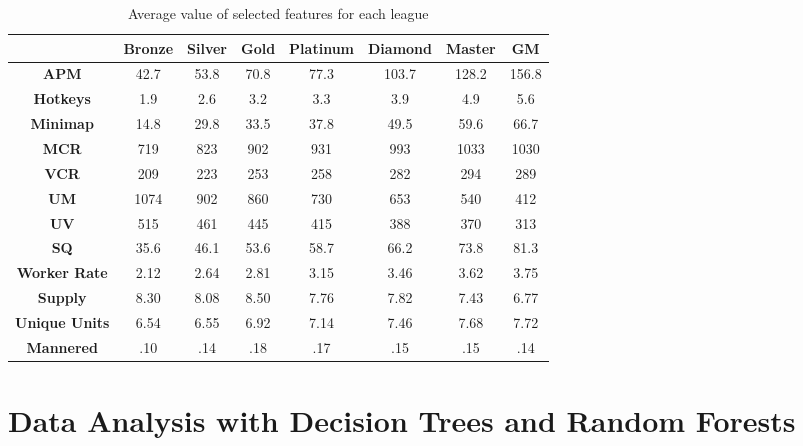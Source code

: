 \documentclass{article} %
\begin{document}
\begin{table}[H]
\renewcommand{\arraystretch}{1.25}
\label{tab:average_values}
\caption {Average value of selected features for each league} 
\vspace{3 mm}
    \begin{tabular}{|c|ccccccc|}
    \hline
                    & \textbf{Bronze} & \textbf{Silver} & \textbf{Gold} & \textbf{Platinum} & \textbf{Diamond} & \textbf{Master} & \textbf{GM} \\ \hline
    \textbf{APM}          & 42.7   & 53.8   & 70.8 & 77.3     & 103.7   & 128.2  & 156.8       \\ \hline
    \textbf{Hotkeys}      & 1.9    & 2.6    & 3.2  & 3.3      & 3.9     & 4.9    & 5.6         \\ \hline
    \textbf{Minimap}      & 14.8   & 29.8   & 33.5 & 37.8     & 49.5    & 59.6   & 66.7        \\ \hline
    \textbf{MCR}          & 719    & 823    & 902  & 931      & 993     & 1033   & 1030        \\ \hline
    \textbf{VCR}          & 209    & 223    & 253  & 258      & 282     & 294    & 289         \\ \hline
    \textbf{UM}           & 1074   & 902    & 860  & 730      & 653     & 540    & 412         \\ \hline
    \textbf{UV}           & 515    & 461    & 445  & 415      & 388     & 370    & 313         \\ \hline
    \textbf{SQ}           & 35.6   & 46.1   & 53.6 & 58.7     & 66.2    & 73.8   & 81.3        \\ \hline
    \textbf{Worker Rate}      & 2.12   & 2.64   & 2.81 & 3.15     & 3.46    & 3.62   & 3.75        \\ \hline
    \textbf{Supply}       & 8.30   & 8.08   & 8.50 & 7.76     & 7.82    & 7.43   & 6.77        \\ \hline
    \textbf{Unique Units} & 6.54   & 6.55   & 6.92 & 7.14     & 7.46    & 7.68   & 7.72        \\ \hline
    \textbf{Mannered}     & .10    & .14    & .18  & .17      & .15     & .15    & .14         \\ \hline
    \end{tabular}
\end{table}

\section{Data Analysis with Decision Trees and Random Forests}
\end{document}
